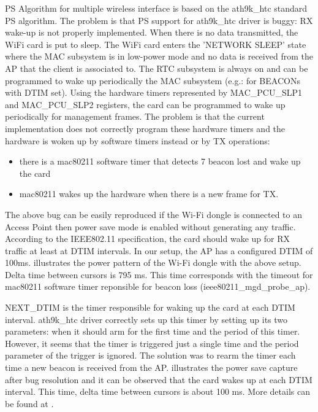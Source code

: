 PS Algorithm for multiple wireless interface is based on the ath9k_htc standard PS algorithm. The problem is that PS support for ath9k_htc driver is buggy: RX wake-up is not properly implemented. When there is no data transmitted, the WiFi card is put to sleep. The WiFi card enters the 'NETWORK SLEEP' state where the MAC subsystem is in low-power mode and no data is received from the AP that the client is associated to. The RTC subsystem is always on and can be programmed to wake up periodically the MAC subsystem (e.g.: for BEACONs with DTIM set). Using the hardware timers represented by MAC_PCU_SLP1 and MAC_PCU_SLP2 registers, the card can be programmed to wake up periodically for management frames. The problem is that the current implementation does not correctly program these hardware timers and the hardware is woken up by software timers instead or by TX operations:
\begin{itemize}
\item there is a mac80211 software timer that detects 7 beacon lost and wake up the card
\item mac80211 wakes up the hardware when there is a new frame for TX.
\end{itemize}

The above bug can be easily reproduced if the Wi-Fi dongle is connected to an Access Point then power save mode is enabled without generating any traffic. According to the IEEE802.11 specification, the card should wake up for RX traffic at least at DTIM intervals. In our setup, the AP has a configured DTIM of 100ms.  illustrates the power pattern of the Wi-Fi dongle with the above setup. Delta time between cursors is 795 ms. This time corresponds with the timeout for mac80211 software timer reponsible for beacon loss (ieee80211_mgd_probe_ap).

NEXT_DTIM is the timer responsible for waking up the card at each DTIM interval. ath9k_htc driver correctly sets up this timer by setting up its two parameters: when it should arm for the first time and the period of this timer. However, it seems that the timer is triggered just a single time and the period parameter of the trigger is ignored. The solution was to rearm the timer each time a new beacon is received from the AP.  illustrates the power save capture after bug resolution and it can be observed that the card wakes up at each DTIM interval. This time, delta time between cursors is about 100 ms. More details can be found at \cite{cite-wikisingleps}.

